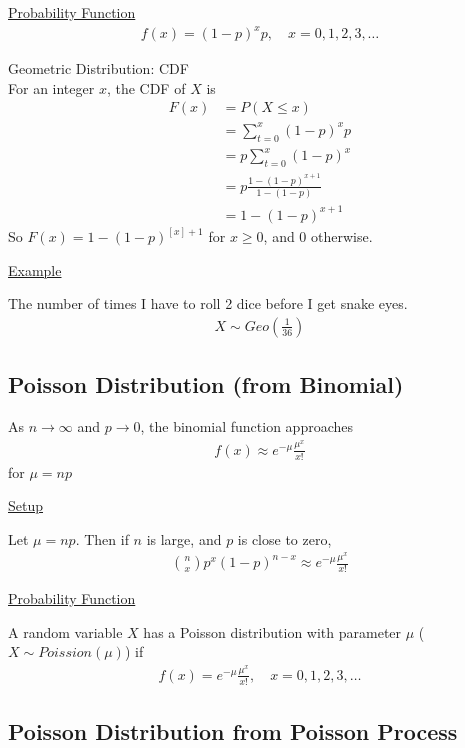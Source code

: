 \documentclass{article}
\begin{document}
\underline{Probability Function}
\begin{align*}
    f(x) = (1-p)^xp, \quad x = 0,1,2,3,\ldots
\end{align*}

Geometric Distribution: CDF\\
For an integer $x$, the CDF of $X$ is
\begin{align*}
    F(x) &= P(X \le x)\\
    &= \sum_{t=0}^x(1-p)^xp\\
    &=p\sum_{t=0}^x(1-p)^x\\
    &=p\frac{1-(1-p)^{x+1}}{1-(1-p)}\\
    &= 1-(1-p)^{x+1}
\end{align*}
So $F(x) = 1 - (1-p)^{[x]+1}$ for $x \ge 0$, and 0 otherwise.

\underline{Example}

The number of times I have to roll 2 dice before I get snake eyes.
\begin{align*}
    X \sim Geo(\frac{1}{36})
\end{align*}


\subsection{Poisson Distribution (from Binomial)}

As $n \to \infty$ and $p \to 0$, the binomial function approaches
\begin{align*}
    f(x) \approx e^{-\mu}\frac{\mu^x}{x!}
\end{align*}
for $\mu = np$

\underline{Setup}

Let $\mu = np$. Then if $n$ is large, and $p$ is close to zero,
\begin{align*}
    \binom{n}{x}p^x(1-p)^{n-x} \approx e^{-\mu}\frac{\mu^x}{x!}
\end{align*}

\underline{Probability Function}

A random variable $X$ has a Poisson distribution with parameter $\mu$ ($X \sim Poission(\mu)$) if 
\begin{align*}
    f(x) = e^{-\mu}\frac{\mu^x}{x!}, \quad x=0,1,2,3,\ldots
\end{align*}

\subsection{Poisson Distribution from Poisson Process}
\end{document}

